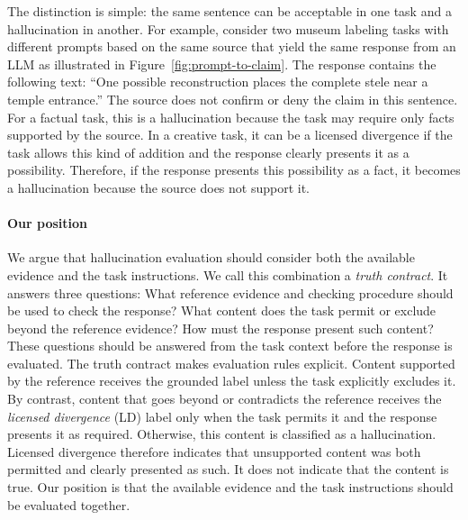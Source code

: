 \documentclass{clv2025}
\newcommand{\LD}{\textsc{LD}}
\begin{document}

The distinction is simple: the same sentence can be acceptable in one task and
a hallucination in another. For example, consider two museum labeling tasks with different prompts based on the same
source that yield the same response from an LLM as illustrated in Figure~\ref{fig:prompt-to-claim}. 
The response contains the following text: ``One possible reconstruction places the complete
stele near a temple entrance.'' The source does not confirm or deny the claim in this 
sentence.
For a factual task, this is a hallucination because the task may require only
facts supported by the source. In a creative task, it can be a licensed divergence
if the task allows this kind of addition and the response clearly presents it
as a possibility.
Therefore, if the response presents this possibility as a fact, it becomes a hallucination
because the source does not support it.




\paragraph{Our position}
We argue that hallucination evaluation should consider both the available
evidence and the task instructions. We call this combination a \emph{truth
contract}. It answers three questions: What reference evidence and checking procedure should be used to check the response? What content does the task permit or exclude beyond the reference evidence? How must the response present such content? 
These questions should be answered from the task context
before the response is evaluated.
The truth contract makes evaluation rules explicit. Content supported by the reference receives the grounded label unless the task explicitly excludes it.
By contrast, content that goes beyond or contradicts the reference receives the \emph{licensed divergence} (\LD) label only when the task permits it and the response presents it as required.
Otherwise, this content is classified as a
hallucination. Licensed divergence therefore indicates
that unsupported content was both permitted and clearly presented as such. It
does not indicate that the content is true. Our position is that the available evidence and the task instructions should
be evaluated together.
\end{document}
